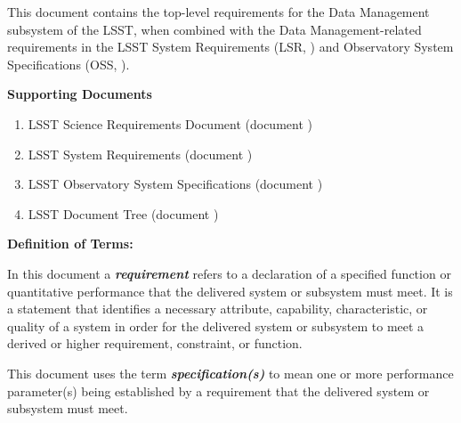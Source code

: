 \documentclass[SE,toc,lsstdraft]{lsstdoc}
\begin{document}
\maketitle


This document contains the top-level requirements for the Data Management subsystem of the LSST, when combined with the Data Management-related requirements in the LSST System Requirements (LSR, ) and Observatory System Specifications (OSS, ).









\textbf{Supporting Documents}



    \begin{enumerate}
\item
LSST Science Requirements Document (document )

\item
LSST System Requirements (document )

\item
LSST Observatory System Specifications (document )

\item
LSST Document Tree (document )

    \end{enumerate}

\textbf{Definition of Terms:}









In this document a \textbf{\textit{requirement}} refers to a declaration of a specified function or quantitative performance that the delivered system or subsystem must meet. It is a statement that identifies a necessary attribute, capability, characteristic, or quality of a system in order for the delivered system or subsystem to meet a derived or higher requirement, constraint, or function.









This document uses the term \textbf{\textit{specification(s)}} to mean one or more performance parameter(s) being established by a requirement that the delivered system or subsystem must meet.
\end{document}
